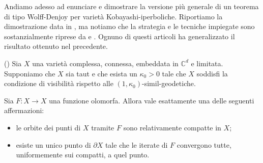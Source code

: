 Andiamo adesso ad enunciare e dimostrare la versione più generale di un teorema di tipo Wolff-Denjoy per varietà Kobayashi-iperboliche. Riportiamo la dimostrazione data in \cite{CMS}, ma notiamo che la strategia e le tecniche impiegate sono sostanzialmente riprese da \cite{BZ1} e \cite{BM}. Ognuno di questi articoli ha generalizzato il risultato ottenuto nel precedente.

\begin{thm} \label{wd_type}
    (\cite[Theorem 1.15]{CMS}) Sia $X$ una varietà complessa, connessa, embeddata in $\mathbb{C}^d$ e limitata. Supponiamo che $X$ sia taut e che esista un $\kappa_0>0$ tale che $X$ soddisfi la condizione di visibilità rispetto alle $(1,\kappa_0)$-simil-geodetiche.
    
    Sia $F:X \longrightarrow X$ una funzione olomorfa. Allora vale esattamente una delle seguenti affermazioni:
    \begin{itemize}
        \item le orbite dei punti di $X$ tramite $F$ sono relativamente compatte in $X$;
        \item esiste un unico punto di $\partial X$ tale che le iterate di $F$ convergono tutte, uniformemente sui compatti, a quel punto.
    \end{itemize}
\end{thm}

